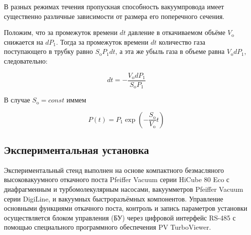 \documentclass[12pt,a4paper]{article}
\begin{document}
	В разных режимах течения пропускная способность вакуумпровода имеет существенно различные зависимости от размера его поперечного сечения.
	
	Положим, что за промежуток времени $dt$ давление
	в откачиваемом объёме $V_{\text{o}}$ снижается на $dP_1$. Тогда за промежуток времени $dt$ количество газа поступающего в трубку равно $S_{\text{o}} P_1 dt$, а эта же
	убыль газа в объеме равна $V_{\text{o}} dP_1$, следовательно:
	
	\begin{equation}
		dt = - \frac{V_{\text{o}} dP_1}{S_{\text{o}}P_1}
	\end{equation}
	
	В случае $S_{\text{o}} = const$ иммем 
	
	\begin{equation}
		P(t) = P_1 \exp \left( - \frac{S_{\text{o}}}{V_{\text{o}}}t \right)
	\end{equation}
	
	
	\subsection*{Экспериментальная установка}
	
	Экспериментальный стенд выполнен на основе компактного безмасляного высоковакуумного откачного поста Pfeiffer Vacuum серии HiCube 80 Eco с диафрагменным и турбомолекулярным насосами, вакуумметров Pfeiffer Vacuum серии DigiLine, и вакуумных быстроразъёмных компонентов. Управление основными функциями откачного
	поста, контроль и запись параметров установки осуществляется блоком управления (БУ) через цифровой интерфейс RS-485 с помощью специального программного обеспечения PV TurboViewer.
	
\end{document}
